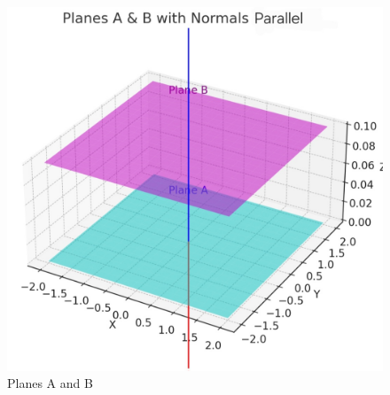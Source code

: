 \documentclass{beamer}
\begin{document}
\begin{figure}
    \centering
    \includegraphics[width=0.75\columnwidth]{graph .jpg}
    \caption{Planes A and B}
    \label{fig:placeholder}
\end{figure}
\end{document}
